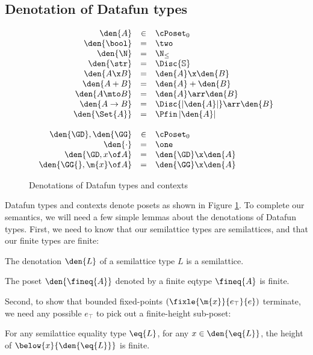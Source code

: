
\subsection{Denotation of Datafun types}
\begin{figure}
  \[\begin{array}{rcl}
  \den{A} &\in& \cPoset_0\\
  \den{\bool} &=& \two\\
  \den{\N} &=& \N_\le\\
  \den{\str} &=& \Disc{\mathbb{S}}\\
  \den{A \x B} &=& \den{A} \x \den{B}\\
  \den{A + B} &=& \den{A} + \den{B}\\
  \den{A \mto B} &=& \den{A} \arr \den{B}\\
  \den{A \uto B} &=& \Disc{\U{\den{A}}} \arr \den{B}\\
  \den{\Set{A}} &=& \Pfin\,{\U{\den{A}}}
  \\\\
  \den{\GD}, \den{\GG} &\in& \cPoset_0\\
  \den{\cdot} &=& \one\\
  \den{\GD, x\of A} &=& \den{\GD} \x \den{A}\\
  \den{\GG{}, \m{x}\of A} &=& \den{\GG} \x \den{A}
  \end{array}\]
  \caption{Denotations of Datafun types and contexts}
  \label{fig:sem-types}
\end{figure}

Datafun types and contexts denote posets as shown in Figure \ref{fig:sem-types}.
To complete our semantics, we will need a few simple lemmas about the
denotations of Datafun types. First, we need to know that our semilattice types
are semilattices, and that our finite types are finite:

\begin{lemma}
  The denotation $\den{L}$ of a semilattice type $L$ is a semilattice.
\end{lemma}

\begin{lemma}
  The poset $\den{\fineq{A}}$ denoted by a finite eqtype $\fineq{A}$ is finite.
\end{lemma}

Second, to show that bounded fixed-points $(\fixle{\m{x}}{e_\top}{e})$
terminate, we need any possible $e_\top$ to pick out a finite-height sub-poset:

\begin{lemma}
  For any semilattice equality type $\eq{L}$, for any $x \in \den{\eq{L}}$, the
  height of $\below{x}{\den{\eq{L}}}$ is finite.
\end{lemma}

